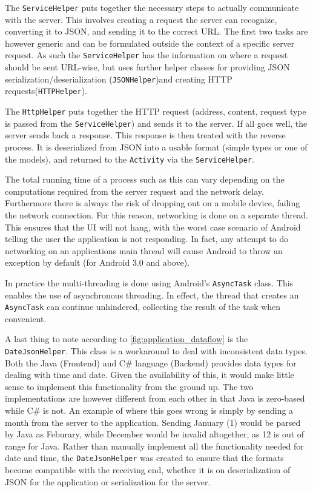 The \texttt{ServiceHelper} puts together the necessary steps to actually communicate with the server. This involves creating a request the server can recognize, converting it to JSON, and sending it to the correct URL. The first two tasks are however generic and can be formulated outside the context of a specific server request. As such the \texttt{ServiceHelper} has the information on where a request should be sent URL-wise, but uses further helper classes for providing JSON serialization/deserialization (\texttt{JSONHelper})and creating HTTP requests(\texttt{HTTPHelper}).

The \texttt{HttpHelper} puts together the HTTP request (address, content, request type is passed from the \texttt{ServiceHelper}) and sends it to the server. If all goes well, the server sends back a response. This response is then treated with the reverse process. It is deserialized from JSON into a usable format (simple types or one of the models), and returned to the \texttt{Activity} via the \texttt{ServiceHelper}.

The total running time of a process such as this can vary depending on the computations required from the server request and the network delay. Furthermore there is always the risk of dropping out on a mobile device, failing the network connection. For this reason, networking is done on a separate thread. This ensures that the UI will not hang, with the worst case scenario of Android telling the user the application is not responding. In fact, any attempt to do networking on an applications main thread will cause Android to throw an exception by default (for Android 3.0 and above)\cite{networking_mainthread}.

In practice the multi-threading is done using Android's \texttt{AsyncTask} class. This enables the use of asynchronous threading. In effect, the thread that creates an \texttt{AsyncTask} can continue unhindered, collecting the result of the task when convenient\cite{asynctask}.

A last thing to note according to \ref{fig:application_dataflow} is the \texttt{DateJsonHelper}. This class is a workaround to deal with inconsistent data types. Both the Java (Frontend) and C\# language (Backend) provides data types for dealing with time and date. Given the availability of this, it would make little sense to implement this functionality from the ground up. The two implementations are however different from each other in that Java is zero-based while C\# is not. An example of where this goes wrong is simply by sending a month from the server to the application. Sending January (1) would be parsed by Java as Feburary, while December would be invalid altogether, as 12 is out of range for Java.
Rather than manually implement all the functionality needed for date and time, the \texttt{DateJsonHelper} was created to ensure that the formats become compatible with the receiving end, whether it is on deserialization of JSON for the application or serialization for the server.